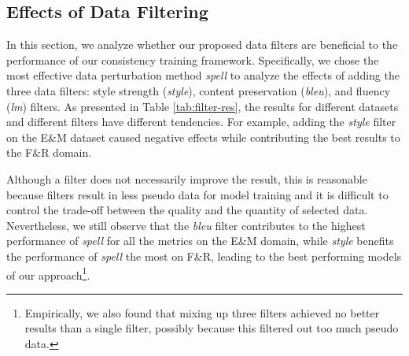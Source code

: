 \subsection{Effects of Data Filtering}
\label{sec:df}
In this section, we analyze whether our proposed data filters are beneficial to the performance of our consistency training framework. Specifically, we chose the most effective data perturbation method \textit{spell} to analyze the effects of adding the three data filters: style strength (\textit{style}), content preservation (\textit{bleu}), and fluency (\textit{lm}) filters. As presented in Table \ref{tab:filter-res}, the results for different datasets and different filters have different tendencies. For example, adding the \textit{style} filter on the E\&M dataset caused negative effects while contributing the best results to the F\&R domain.

Although a filter does not necessarily improve the result, this is reasonable because filters result in less pseudo data for model training and it is difficult to control the trade-off between the quality and the quantity of selected data. Nevertheless, we still observe that the \textit{bleu} filter contributes to the highest performance of \textit{spell} for all the metrics on the E\&M domain, while \textit{style} benefits the performance of \textit{spell} the most on F\&R, leading to the best performing models of our approach\footnote{Empirically, we also found that mixing up three filters achieved no better results than a single filter, possibly because this filtered out too much pseudo data.}. 



\begin{table}[t]
    \centering
    \caption{Human evaluation results.}
    \label{tab:human}
\end{table}


